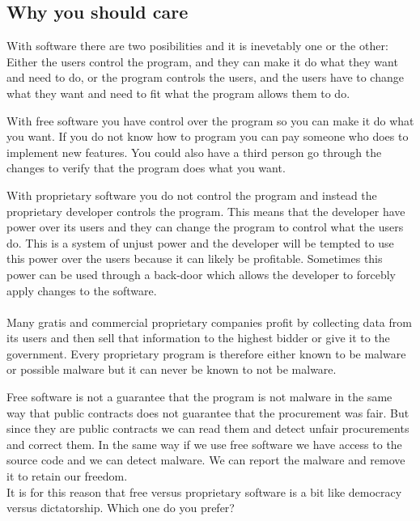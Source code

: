 \documentclass[12pt,a4paper]{article}
\begin{document}
\subsection{Why you should care}
With software there are two posibilities and it is inevetably one or the other: Either the users control the program, and they can make it do what they want and need to do, or the program controls the users, and the users have to change what they want and need to fit what the program allows them to do.

With free software you have control over the program so you can make it do what you want. If you do not know how to program you can pay someone who does to implement new features. You could also have a third person go through the changes to verify that the program does what you want.

With proprietary software you do not control the program and instead the proprietary developer controls the program. This means that the developer have power over its users and they can change the program to control what the users do. This is a system of unjust power and the developer will be tempted to use this power over the users because it can likely be profitable. Sometimes this power can be used through a back-door which allows the developer to forcebly apply changes to the software.
\\\\
Many gratis and commercial proprietary companies profit by collecting data from its users and then sell that information to the highest bidder or give it to the government. Every proprietary program is therefore either known to be malware or possible malware but it can never be known to not be malware.

Free software is not a guarantee that the program is not malware in the same way that public contracts does not guarantee that the procurement was fair. But since they are public contracts we can read them and detect unfair procurements and correct them. In the same way if we use free software we have access to the source code and we can detect malware. We can report the malware and remove it to retain our freedom. \\
It is for this reason that free versus proprietary software is a bit like democracy versus dictatorship. Which one do you prefer?
\end{document}
